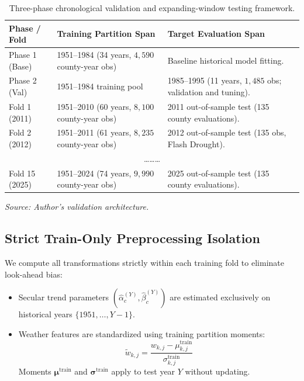 \begin{table}[htbp]
\centering
\singlespacing
\footnotesize
\setlength{\tabcolsep}{5pt}
\renewcommand{\arraystretch}{1.1}
\caption{Three-phase chronological validation and expanding-window testing framework.}
\label{tab:validation_phases}
\begin{tabularx}{\textwidth}{l p{7.0cm} X}
\toprule
\textbf{Phase / Fold} & \textbf{Training Partition Span} & \textbf{Target Evaluation Span} \\
\midrule
Phase 1 (Base) & 1951--1984 (34 years, $4{,}590$ county-year obs) & Baseline historical model fitting. \\
Phase 2 (Val)  & 1951--1984 training pool & 1985--1995 (11 years, $1{,}485$ obs; validation and tuning). \\
\midrule
Fold 1 (2011)  & 1951--2010 (60 years, $8{,}100$ county-year obs) & 2011 out-of-sample test (135 county evaluations). \\
Fold 2 (2012)  & 1951--2011 (61 years, $8{,}235$ county-year obs) & 2012 out-of-sample test (135 obs, Flash Drought). \\
\multicolumn{3}{c}{\dots \dots \dots} \\
Fold 15 (2025) & 1951--2024 (74 years, $9{,}990$ county-year obs) & 2025 out-of-sample test (135 county evaluations). \\
\bottomrule
\end{tabularx}
\vspace{0.2em}
{\footnotesize \textit{Source: Author's validation architecture.}}
\end{table}

\subsection{Strict Train-Only Preprocessing Isolation}
\label{sec:meth_hermetic_seal}

We compute all transformations strictly within each training fold to eliminate look-ahead bias:
\begin{itemize}
    \item Secular trend parameters $(\hat{\alpha}_c^{(Y)}, \hat{\beta}_c^{(Y)})$ are estimated exclusively on historical years $\{1951, \dots, Y-1\}$.
    \item Weather features are standardized using training partition moments:
    \begin{equation}
        \tilde{w}_{k,j} = \frac{w_{k,j} - \mu_{k,j}^{\text{train}}}{\sigma_{k,j}^{\text{train}}}
        \label{eq:feature_standardization}
    \end{equation}
    Moments $\mathbf{\mu}^{\text{train}}$ and $\mathbf{\sigma}^{\text{train}}$ apply to test year $Y$ without updating.
\end{itemize}

